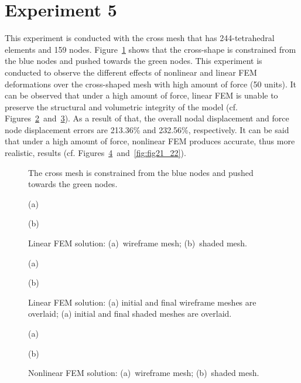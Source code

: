 \clearpage

\section{Experiment 5}
\label{v}

This experiment is conducted with the cross mesh that has 244-tetrahedral elements and 159 nodes. Figure~\ref{fig:fig14} shows that the cross-shape is constrained from the blue nodes and pushed towards the green nodes. This experiment is conducted to observe the different effects of nonlinear and linear FEM deformations over the cross-shaped mesh with high amount of force (50 units). It can be observed that under a high amount of force, linear FEM is unable to preserve the structural and volumetric integrity of the model (cf. Figures~\ref{fig:fig15_16}~and~\ref{fig:fig17_18}). As a result of that, the overall nodal displacement and force node displacement errors are 213.36\% and 232.56\%, respectively. It can be said that under a high amount of force, nonlinear FEM produces accurate, thus more realistic, results (cf. Figures~\ref{fig:fig19_20}~and~\ref{fig:fig21_22}).

\begin{figure}[h]
\centerline{}
\caption{The cross mesh is constrained from the blue nodes and pushed towards the green nodes.}
\label{fig:fig14}
\end{figure}

\begin{figure}[h]
\centerline{}
\centerline{(a)}
\centerline{}
\centerline{(b)}
\caption{Linear FEM solution: (a)~wireframe mesh; (b)~shaded mesh.}
\label{fig:fig15_16}
\end{figure}

\begin{figure}[h]
\centerline{}
\centerline{(a)}
\centerline{}
\centerline{(b)}
\caption{Linear FEM solution: (a) initial and final wireframe meshes are overlaid; (a) initial and final shaded meshes are overlaid.}
\label{fig:fig17_18}
\end{figure}

\begin{figure}[h]
\centerline{}
\centerline{(a)}
\centerline{}
\centerline{(b)}
\caption{Nonlinear FEM solution: (a)~wireframe mesh; (b)~shaded mesh.}
\label{fig:fig19_20}
\end{figure}

